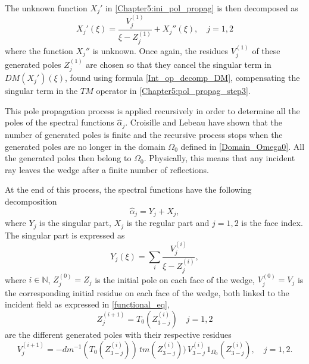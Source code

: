 The unknown function $X_j'$ in \eqref{Chapter5:ini_pol_propag} is then decomposed as
\begin{equation}
\label{Chapter5:pol_propag_step2}
X_j'(\xi) =  \dfrac{V_j^{(1)}}{\xi - Z_j^{(1)}} + X_j''(\xi), \quad j=1,2
\end{equation}
where the function $ X_j''$ is unknown. 
Once again, the residues $V_j^{(1)}$ of these generated poles $Z_j^{(1)}$ are chosen so that they cancel the singular term in $DM(X_j')(\xi)$, found using formula \eqref{Int_op_decomp_DM}, compensating the singular term in the $TM$ operator in \eqref{Chapter5:pol_propag_step3}.

This pole propagation process is applied recursively in order to determine all the poles of the spectral functions $\hat{\alpha}_j$. Croisille and Lebeau \cite{CroisilleLebeau} have shown that the number of generated poles is finite and the recursive process stops when the generated poles are no longer in the domain $\Omega_0$ defined in \eqref{Domain_Omega0}. All the generated poles then belong to $\Omega_0$. Physically, this means that any incident ray leaves the wedge after a finite number of reflections.

At the end of this process, the spectral functions have the following decomposition
\begin{equation}
\label{spec_decomp}
\hat{\alpha}_j=Y_j+X_j, 
\end{equation}
where  $Y_j$ is the singular part, $X_j$ is the regular part  and $j=1,2$ is the face index. The singular part is expressed as
\begin{equation}
\label{sing_part}
 Y_j(\xi) = \sum_i \dfrac{{V_j^{(i)}}}{{\xi - Z_j^{(i)}}},
\end{equation}
where $i \in \mathbb{N}$, $Z_j^{(0)} = Z_j$ is the initial pole on each face of the wedge, $V_j^{(0)}=V_j$ is the corresponding initial residue on each face of the wedge, both linked to the incident field as expressed in \eqref{functional_eq},
\begin{equation}
\label{Generated_poles}
Z_j^{(i+1)} = T_0(Z_{3-j}^{(i)}) \quad j=1,2
\end{equation} 
are the different generated poles with their respective residues 
\begin{equation}
\label{Generated_residues}
V_j^{(i+1)}=-dm^{-1}(T_0(Z_{3-j}^{(i)})) \,  tm(Z_{3-j}^{(i)})) \, V_{3-j}^{(i)} \, 1_{\Omega_0}(Z_{3-j}^{(i)}), \quad  j=1,2.
\end{equation}
